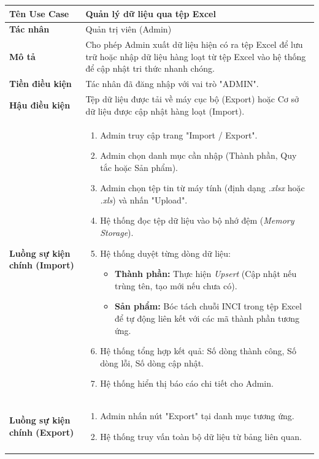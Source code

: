 \documentclass[12pt,a4paper]{article}
\begin{document}
\begin{center}
\renewcommand{\arraystretch}{1.4}
\begin{tabular}{|p{4cm}|p{10cm}|}
\hline
\rowcolor{blue!15}
\textbf{Tên Use Case} & \textbf{Quản lý dữ liệu qua tệp Excel} \\ \hline
\textbf{Tác nhân} & Quản trị viên (Admin) \\ \hline
\textbf{Mô tả} & Cho phép Admin xuất dữ liệu hiện có ra tệp Excel để lưu trữ hoặc nhập dữ liệu hàng loạt từ tệp Excel vào hệ thống để cập nhật tri thức nhanh chóng. \\ \hline
\textbf{Tiền điều kiện} & Tác nhân đã đăng nhập với vai trò "ADMIN". \\ \hline
\textbf{Hậu điều kiện} & Tệp dữ liệu được tải về máy cục bộ (Export) hoặc Cơ sở dữ liệu được cập nhật hàng loạt (Import). \\ \hline
\textbf{Luồng sự kiện chính (Import)} & 
\begin{enumerate}
    \item Admin truy cập trang "Import / Export".
    \item Admin chọn danh mục cần nhập (Thành phần, Quy tắc hoặc Sản phẩm).
    \item Admin chọn tệp tin từ máy tính (định dạng \textit{.xlsx} hoặc \textit{.xls}) và nhấn "Upload".
    \item Hệ thống đọc tệp dữ liệu vào bộ nhớ đệm (\textit{Memory Storage}).
    \item Hệ thống duyệt từng dòng dữ liệu:
        \begin{itemize}
            \item \textbf{Thành phần:} Thực hiện \textit{Upsert} (Cập nhật nếu trùng tên, tạo mới nếu chưa có).
            \item \textbf{Sản phẩm:} Bóc tách chuỗi INCI trong tệp Excel để tự động liên kết với các mã thành phần tương ứng.
        \end{itemize}
    \item Hệ thống tổng hợp kết quả: Số dòng thành công, Số dòng lỗi, Số dòng cập nhật.
    \item Hệ thống hiển thị báo cáo chi tiết cho Admin.
\end{enumerate} \\ \hline
\textbf{Luồng sự kiện chính (Export)} & 
\begin{enumerate}
    \item Admin nhấn nút "Export" tại danh mục tương ứng.
    \item Hệ thống truy vấn toàn bộ dữ liệu từ bảng liên quan.

\end{enumerate}
\end{tabular}
\end{center}
\end{document}
